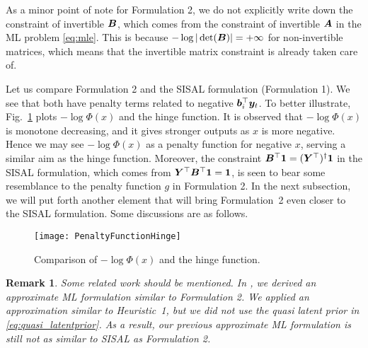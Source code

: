 \documentclass[10pt,twocolumn,twoside]{IEEEtran}
\newtheorem{Remark}{Remark}
\begin{document}
\medskip

As a minor point of note for Formulation 2, we do not explicitly write down the constraint of invertible ${\bm B}$, which comes from the constraint of invertible ${\bm A}$ in the ML problem \eqref{eq:mle}.
This is because $-\log | \det({\bm B}) | = +\infty$ for non-invertible matrices, which means that the invertible matrix constraint is already taken care of.

Let us compare Formulation 2 and the SISAL formulation (Formulation 1).
We see that both have penalty terms related to negative ${\bm b}_i^\top {\bm y}_t$.
To better illustrate, Fig.~\ref{fig:penaltyfunctionhinge} plots $-\log \Phi(x)$ and the hinge function.
It is observed that  $-\log \Phi(x)$ is monotone decreasing, and it gives stronger outputs as $x$ is more negative.
Hence we may see $-\log \Phi(x)$ as a penalty function for negative $x$, serving a similar aim as the hinge function.
Moreover, the constraint ${\bm B}^\top {\bm 1} = ({\bm Y}^\top )^\dag {\bm 1}$ in the SISAL formulation, which comes from ${\bm Y}^\top {\bm B}^\top {\bm 1} = {\bm 1}$, is seen to bear some resemblance to the penalty function $g$ in Formulation 2.
In the next subsection, we will put forth another element that will bring Formulation~2 even closer to the SISAL formulation.
Some discussions are as follows.


\begin{figure}[hbt]
	\centering \texttt{[image: PenaltyFunctionHinge]}
	\caption{Comparison of $-\log \Phi(x)$ and the hinge function.}
	\label{fig:penaltyfunctionhinge}
\end{figure}

\begin{Remark}
	Some related work should be mentioned. In \cite{PRISM2021}, we derived an approximate ML formulation similar to Formulation 2. We applied an approximation similar to Heuristic~1, but we did not use the quasi latent prior in \eqref{eq:quasi_latentprior}.
	As a result, our previous approximate ML formulation is still not as similar to SISAL as Formulation 2.
\end{Remark}
\end{document}
